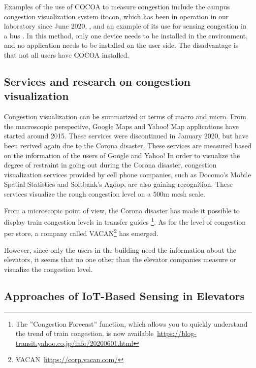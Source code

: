 Examples of the use of COCOA to measure congestion include the campus congestion visualization system itocon, which has been in operation in our laboratory since June 2020, \cite{research_itocon}, and an example of its use for sensing congestion in a bus \cite{kanamitu-2021-dicomo}. In this method, only one device needs to be installed in the environment, and no application needs to be installed on the user side. The disadvantage is that not all users have COCOA installed.


\subsection{Services and research on congestion visualization}

Congestion visualization can be summarized in terms of macro and micro. From the macroscopic perspective, Google Maps and Yahoo! Map applications have started around 2015. These services were discontinued in January 2020, but have been revived again due to the Corona disaster. These services are measured based on the information of the users of Google and Yahoo! In order to visualize the degree of restraint in going out during the Corona disaster, congestion visualization services provided by cell phone companies, such as Docomo's Mobile Spatial Statistics and Softbank's Agoop, are also gaining recognition. These services visualize the rough congestion level on a 500m mesh scale.

From a microscopic point of view, the Corona disaster has made it possible to display train congestion levels in transfer guides \footnote{The ''Congestion Forecast'' function, which allows you to quickly understand the trend of train congestion, is now available~\url{https://blog-transit.yahoo.co.jp/info/20200601.html}}. As for the level of congestion per store, a company called VACAN\footnote{VACAN~\url{https://corp.vacan.com/}} has emerged.

However, since only the users in the building need the information about the elevators, it seems that no one other than the elevator companies measure or visualize the congestion level.


\subsection{Approaches of IoT-Based Sensing in Elevators}

